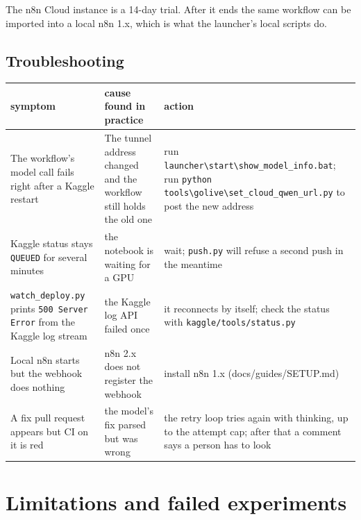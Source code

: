 \documentclass[11pt,a4paper]{report}
\begin{document}
The n8n Cloud instance is a 14-day trial. After it ends the same workflow can be imported into a local n8n 1.x, which is what the launcher's local scripts do.

\section{Troubleshooting}

\begin{longtable}{>{\raggedright\arraybackslash}p{0.333\dimexpr\linewidth-6\tabcolsep\relax}>{\raggedright\arraybackslash}p{0.333\dimexpr\linewidth-6\tabcolsep\relax}>{\raggedright\arraybackslash}p{0.333\dimexpr\linewidth-6\tabcolsep\relax}}
\toprule
\textbf{symptom} & \textbf{cause found in practice} & \textbf{action} \\
\midrule
\endhead
The workflow's model call fails right after a Kaggle restart & The tunnel address changed and the workflow still holds the old one & run \texttt{launcher\textbackslash{}start\textbackslash{}show\_\allowbreak{}model\_\allowbreak{}info.\allowbreak{}bat}; run \texttt{python tools\textbackslash{}golive\textbackslash{}set\_\allowbreak{}cloud\_\allowbreak{}qwen\_\allowbreak{}url.\allowbreak{}py} to post the new address \\
Kaggle status stays \texttt{QUEUED} for several minutes & the notebook is waiting for a GPU & wait; \texttt{push.\allowbreak{}py} will refuse a second push in the meantime \\
\texttt{watch\_\allowbreak{}deploy.\allowbreak{}py} prints \texttt{500 Server Error} from the Kaggle log stream & the Kaggle log API failed once & it reconnects by itself; check the status with \texttt{kaggle/\allowbreak{}tools/\allowbreak{}status.\allowbreak{}py} \\
Local n8n starts but the webhook does nothing & n8n 2.x does not register the webhook & install n8n 1.x (docs/guides/SETUP.md) \\
A fix pull request appears but CI on it is red & the model's fix parsed but was wrong & the retry loop tries again with thinking, up to the attempt cap; after that a comment says a person has to look \\
\bottomrule
\end{longtable}

\chapter{Limitations and failed experiments}
\end{document}
